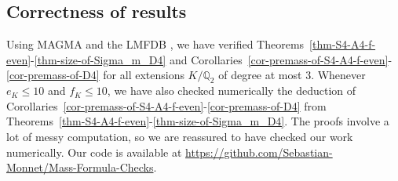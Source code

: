 \documentclass[11pt]{amsart}
\theoremstyle{theorem}
\theoremstyle{example}
\theoremstyle{definition}
\numberwithin{theorem}{section}
\numberwithin{theorem}{section}
\newcommand{\Q}{\mathbb{Q}}
\begin{document}
\subsection{Correctness of results}
Using MAGMA \cite{magma} and the LMFDB \cite{lmfdb}, we have verified Theorems~\ref{thm-S4-A4-f-even}-\ref{thm-size-of-Sigma_m_D4} and Corollaries~\ref{cor-premass-of-S4-A4-f-even}-\ref{cor-premass-of-D4} for all extensions $K/\Q_2$ of degree at most $3$. Whenever $e_K\leq 10$ and $f_K \leq 10$, we have also checked numerically the deduction of Corollaries~\ref{cor-premass-of-S4-A4-f-even}-\ref{cor-premass-of-D4} from Theorems~\ref{thm-S4-A4-f-even}-\ref{thm-size-of-Sigma_m_D4}. The proofs involve a lot of messy computation, so we are reassured to have checked our work numerically. Our code is available at \url{https://github.com/Sebastian-Monnet/Mass-Formula-Checks}.
\end{document}
